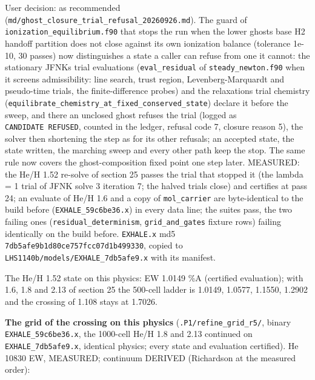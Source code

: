 \documentclass[english,a4paper]{my_memo}
\begin{document}
User decision: as recommended (\texttt{md/ghost\_closure\_trial\_refusal\_20260926.md}).
The guard of \texttt{ionization\_equilibrium.f90} that stops the run when the lower
ghost\textquotesingle s base H2 handoff partition does not close against its own ionization
balance (tolerance 1e-10, 30 passes) now distinguishes a state a caller can
refuse from one it cannot: the stationary JFNK\textquotesingle s trial evaluations
(\texttt{eval\_residual} of \texttt{steady\_newton.f90} when it screens admissibility: line
search, trust region, Levenberg-Marquardt and pseudo-time trials, the
finite-difference probes) and the relaxation\textquotesingle s trial chemistry
(\texttt{equilibrate\_chemistry\_at\_fixed\_conserved\_state}) declare it before the
sweep, and there an unclosed ghost refuses the trial (logged as \texttt{CANDIDATE\ REFUSED}, counted in the ledger, refusal code 7, closure reason 5), the
solver then shortening the step as for its other refusals; an accepted state,
the state written, the marching sweep and every other path keep the stop. The
same rule now covers the ghost-composition fixed point one step later. MEASURED:
the He/H 1.52 re-solve of section 25 passes the trial that stopped it (the
lambda = 1 trial of JFNK solve 3 iteration 7; the halved trials close) and
certifies at pass 24; an evaluate of He/H 1.6 and a copy of \texttt{mol\_carrier}
are byte-identical to the build before (\texttt{EXHALE\_59c6be36.x}) in every data
line; the suites pass, the two failing ones (\texttt{residual\_determinism},
\texttt{grid\_and\_gates} fixture rows) failing identically on the build before.
\texttt{EXHALE.x} md5 \texttt{7db5afe9b1d80ce757fcc07d1b499330}, copied to
\texttt{LHS1140b/models/EXHALE\_7db5afe9.x} with its manifest.

The He/H 1.52 state on this physics: EW 1.0149 \%A (certified evaluation); with
1.6, 1.8 and 2.13 of section 25 the 500-cell ladder is 1.0149, 1.0577,
1.1550, 1.2902 and the crossing of 1.108 stays at 1.7026.

\textbf{The grid of the crossing on this physics} (\texttt{.P1/refine\_grid\_r5/}, binary
\texttt{EXHALE\_59c6be36.x}, the 1000-cell He/H 1.8 and 2.13 continued on
\texttt{EXHALE\_7db5afe9.x}, identical physics; every state and evaluation
certified). He 10830 EW, MEASURED; continuum DERIVED (Richardson at the
measured order):
\end{document}
